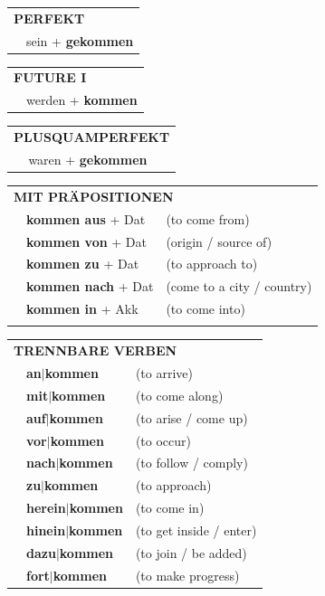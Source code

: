 \documentclass[10pt,a4paper]{revtex4-2}
\begin{document}
\begin{verbbox}
    \vspace{10pt}

 \begin{tabular}{rl}
     \multicolumn{2}{l}{\textbf{PERFEKT}}\\
   & sein + \textbf{gekommen}\\
  \end{tabular}
\hfill
   \begin{tabular}{rl}
   
    \multicolumn{2}{l}{\textbf{FUTURE I} }\\
   & werden + \textbf{kommen}\\
 
  \end{tabular}
\hfill
   \begin{tabular}{rl}
      \multicolumn{2}{l}{\textbf{PLUSQUAMPERFEKT}}\\
   & waren + \textbf{gekommen}\\
  \end{tabular}

  \vspace{10pt}

   \begin{tabular}{lll}
      \multicolumn{3}{l}{\textbf{MIT PRÄPOSITIONEN}}\\
& \textbf{kommen aus} + Dat & (to come from)\\
& \textbf{kommen von} + Dat & (origin / source of)\\
&\textbf{kommen zu} + Dat & (to approach to)\\
&\textbf{kommen nach} + Dat & (come to a city / country)\\
&\textbf{kommen in} + Akk & (to come into)\\
\vspace{50pt}
  \end{tabular}
  \hfill
   \begin{tabular}{lll}
      \multicolumn{3}{l}{\textbf{TRENNBARE VERBEN}}\\
 & \textbf{an$|$kommen} & (to arrive)\\
 & \textbf{mit$|$kommen} & (to come along)\\
     & \textbf{auf$|$kommen} & (to arise / come up)\\
     & \textbf{vor$|$kommen} & (to occur)\\
     & \textbf{nach$|$kommen} & (to follow / comply)\\
     & \textbf{zu$|$kommen} & (to approach)\\
      & \textbf{herein$|$kommen} & (to come in)\\
     & \textbf{hinein$|$kommen} & (to get inside / enter)\\
     & \textbf{dazu$|$kommen} & (to join / be added)\\
      & \textbf{fort$|$kommen} & (to make progress)
  \end{tabular}

  \vspace{-5pt}

  \end{verbbox}
\end{document}
